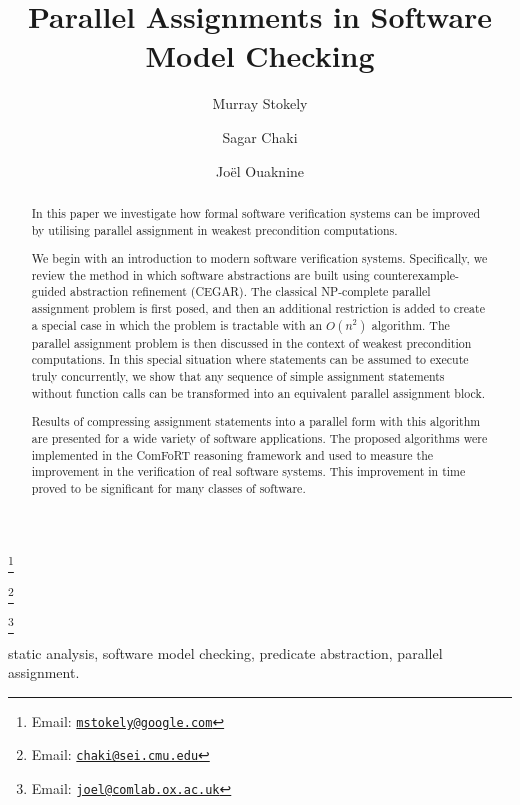 \documentclass{entcs} \usepackage{prentcsmacro}
\begin{document}
\begin{frontmatter}
\title{Parallel Assignments in Software Model Checking}

\author{Murray Stokely}

\address{Google}

\author{Sagar Chaki%
              }

\address{Carnegie Mellon University, Software Engineering Institute,
Pittsburgh, USA}

\author{Jo\"el Ouaknine%
              }

\address{Oxford University Computing Laboratory, UK}

\thanks[murrayemail]{Email: \href{mailto:mstokely@google.com}
            {\texttt{\normalshape mstokely@google.com}}}

\thanks[sagaremail]{Email: \href{mailto:chaki@sei.cmu.edu}
            {\texttt{\normalshape chaki@sei.cmu.edu}}}

\thanks[joelemail]{Email: \href{mailto:joel@comlab.ox.ac.uk}
            {\texttt{\normalshape joel@comlab.ox.ac.uk}}}

%
\begin{abstract}
In this paper we investigate how formal software verification systems
can be improved by utilising parallel assignment in weakest
precondition computations.

We begin with an introduction to modern software verification systems.
Specifically, we review the method in which software abstractions are
built using counterexample-guided abstraction refinement (CEGAR).  The
classical NP-complete parallel assignment problem is first posed, and
then an additional restriction is added to create a special case in
which the problem is tractable with an $O(n^2)$ algorithm.  The
parallel assignment problem is then discussed in the context of
weakest precondition computations.  In this special situation where
statements can be assumed to execute truly concurrently, we show that
any sequence of simple assignment statements without function calls
can be transformed into an equivalent parallel assignment block.

Results of compressing assignment statements into a parallel form with
this algorithm are presented for a wide variety of software
applications.  The proposed algorithms were implemented in the ComFoRT
reasoning framework \cite{comfort} and used to measure the improvement
in the verification of real software systems.  This improvement
in time proved to be significant for many classes of software.
\end{abstract}

\begin{keyword}
static analysis, software model checking, predicate abstraction,
parallel assignment.
\end{keyword}
\end{frontmatter}







% 

\end{document}
